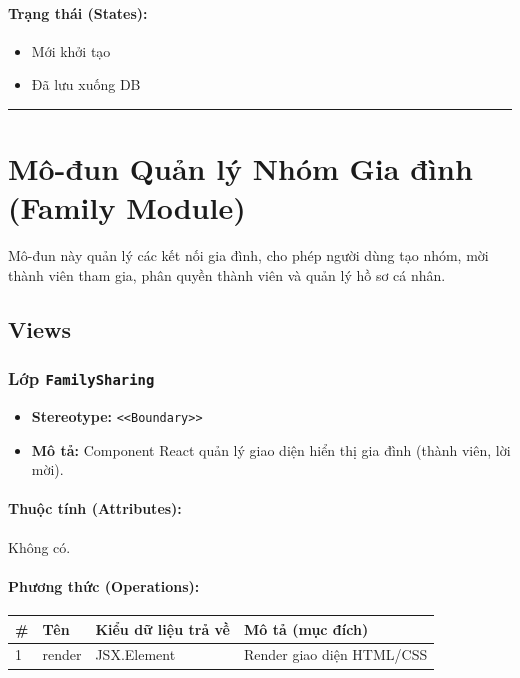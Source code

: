 \documentclass[12pt,a4paper]{article}
\begin{document}
\paragraph{Trạng thái (States):}
\begin{itemize}[leftmargin=*]
    \item Mới khởi tạo
    \item Đã lưu xuống DB
\end{itemize}


\vskip 0.5cm
\noindent\rule{\textwidth}{0.5pt}
\vskip 0.5cm

\section{Mô-đun Quản lý Nhóm Gia đình (Family Module)}

Mô-đun này quản lý các kết nối gia đình, cho phép người dùng tạo nhóm, mời thành viên tham gia, phân quyền thành viên và quản lý hồ sơ cá nhân.

\subsection{Views}

\subsubsection{Lớp \texttt{FamilySharing}}
\begin{itemize}[leftmargin=*]
    \item \textbf{Stereotype:} \texttt{\textless{}\textless{}Boundary\textgreater{}\textgreater{}}
    \item \textbf{Mô tả:} Component React quản lý giao diện hiển thị gia đình (thành viên, lời mời).
\end{itemize}

\paragraph{Thuộc tính (Attributes):}
Không có.

\paragraph{Phương thức (Operations):}
\begin{longtable}{|p{0.6cm}|p{3.8cm}|p{2.6cm}|p{6.5cm}|}
\hline
\textbf{\#} & \textbf{Tên} & \textbf{Kiểu dữ liệu trả về} & \textbf{Mô tả (mục đích)} \\ \hline
\endhead
1 & render & JSX.Element & Render giao diện HTML/CSS \\ \hline
\end{longtable}
\end{document}
